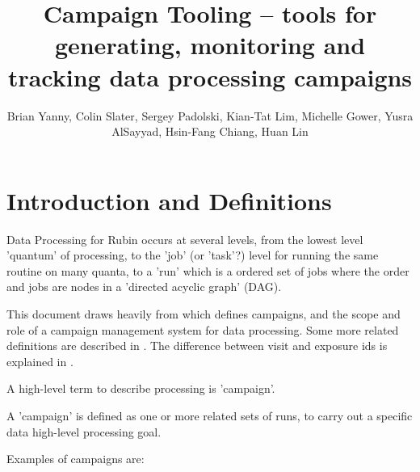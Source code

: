 \documentclass[DM,authoryear,toc]{lsstdoc}
\title{Campaign Tooling -- tools for generating, monitoring and tracking data processing campaigns}
\author{%
Brian Yanny, Colin Slater, Sergey Padolski, Kian-Tat Lim, Michelle Gower, Yusra AlSayyad, Hsin-Fang Chiang, Huan Lin
}
\date{\vcsDate}
\begin{document}
\maketitle


\section{Introduction and Definitions}

Data Processing for Rubin occurs at several levels,
from the lowest level 'quantum' of processing, to the 'job' (or 'task'?) level 
for running the same routine on many quanta, to a 'run' which is a 
ordered set of jobs where the order and jobs are nodes 
in a 'directed acyclic graph' (DAG).

This document draws heavily from \cite{DMTN-181} which defines campaigns, and 
the scope and role of a campaign management system for data processing.
Some more related definitions are described in \cite{DMTN-137}.
The difference between visit and exposure ids is explained in \cite{iddefs}.

A high-level term to describe processing is 'campaign'.

A 'campaign' is defined as one or more related sets of runs, to carry out a
specific data high-level processing goal.  

Examples of campaigns are:
\end{document}
